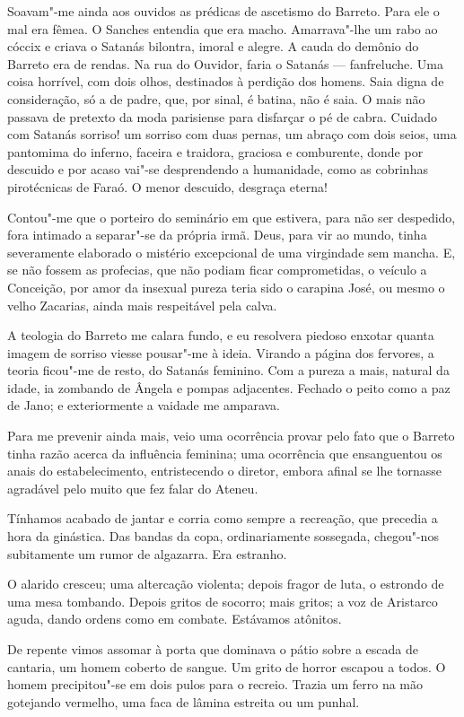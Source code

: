 Soavam"-me ainda aos ouvidos as prédicas de
ascetismo do Barreto. Para ele o mal era fêmea. O Sanches entendia que
era macho. Amarrava"-lhe um rabo ao cóccix e criava o Satanás
bilontra, imoral e alegre. A cauda do demônio do Barreto era de rendas.
Na rua do Ouvidor, faria o Satanás --- fanfreluche. Uma coisa horrível, com
dois olhos, destinados à perdição dos homens. Saia digna de
consideração, só a de padre, que, por sinal, é batina, não é saia. O
mais não passava de pretexto da moda parisiense para disfarçar o pé de
cabra. Cuidado com Satanás sorriso! um sorriso com duas pernas, um
abraço com dois seios, uma pantomima do inferno, faceira e traidora,
graciosa e comburente, donde por descuido e por acaso vai"-se
desprendendo a humanidade, como as cobrinhas pirotécnicas de Faraó. O
menor descuido, desgraça eterna! 

Contou"-me que o porteiro do
seminário em que estivera, para não ser despedido, fora intimado a
separar"-se da própria irmã. Deus, para vir ao mundo, tinha
severamente elaborado o mistério excepcional de uma virgindade sem
mancha. E, se não fossem as profecias, que não podiam ficar
comprometidas, o veículo a Conceição, por amor da insexual pureza teria
sido o carapina José, ou mesmo o velho Zacarias, ainda mais respeitável
pela calva. 

A teologia do Barreto me calara fundo, e eu resolvera
piedoso enxotar quanta imagem de sorriso viesse pousar"-me à ideia.
Virando a página dos fervores, a teoria ficou"-me de resto, do Satanás
feminino. Com a pureza a mais, natural da idade, ia zombando de Ângela
e pompas adjacentes. Fechado o peito como a paz de Jano; e
exteriormente a vaidade me amparava. 

Para me prevenir ainda mais, veio
uma ocorrência provar pelo fato que o Barreto tinha razão acerca da
influência feminina; uma ocorrência que ensanguentou os anais do
estabelecimento, entristecendo o diretor, embora afinal se lhe tornasse
agradável pelo muito que fez falar do Ateneu. 

Tínhamos acabado de
jantar e corria como sempre a recreação, que precedia a hora da
ginástica. Das bandas da copa, ordinariamente sossegada, chegou"-nos
subitamente um rumor de algazarra. Era estranho. 

O alarido cresceu; uma
altercação violenta; depois fragor de luta, o estrondo de uma mesa
tombando. Depois gritos de socorro; mais gritos; a voz de Aristarco
aguda, dando ordens como em combate. Estávamos atônitos. 

De repente vimos assomar à porta que dominava o pátio sobre a escada de cantaria,
um homem coberto de sangue. Um grito de horror escapou a todos. O homem
precipitou"-se em dois pulos para o recreio. Trazia um ferro na mão
gotejando vermelho, uma faca de lâmina estreita ou um punhal. 

